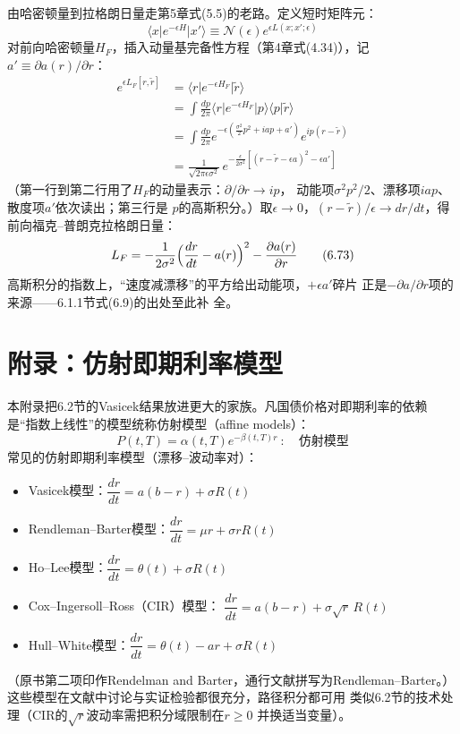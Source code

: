 由哈密顿量到拉格朗日量走第5章式(5.5)的老路。定义短时矩阵元：
\begin{equation*}
\langle x\vert e^{-\epsilon H}\vert x'\rangle\equiv
\mathcal{N}(\epsilon)e^{\epsilon L(x;x';\epsilon)}
\tag{6.72}
\end{equation*}
对前向哈密顿量$H_F$，插入动量基完备性方程（第4章式(4.34)），记
$a'\equiv\partial a(r)/\partial r$：
\begin{align*}
e^{\epsilon L_F[r,\tilde{r}]}&=\langle r\vert e^{-\epsilon H_F}
\vert\tilde{r}\rangle\\
&=\int\frac{dp}{2\pi}\langle r\vert e^{-\epsilon H_F}\vert p\rangle
\langle p\vert\tilde{r}\rangle\\
&=\int\frac{dp}{2\pi}e^{-\epsilon\left(\frac{\sigma^2}{2}p^2+iap+a'\right)}
e^{ip(r-\tilde{r})}\\
&=\frac{1}{\sqrt{2\pi\epsilon\sigma^2}}\,
e^{-\frac{\epsilon}{2\sigma^2}\left[(r-\tilde{r}-\epsilon a)^2
-\epsilon a'\right]}
\end{align*}
（第一行到第二行用了$H_F$的动量表示：$\partial/\partial r\to ip$，
动能项$\sigma^2p^2/2$、漂移项$iap$、散度项$a'$依次读出；第三行是
$p$的高斯积分。）取$\epsilon\to0$，$(r-\tilde{r})/\epsilon\to
dr/dt$，得前向福克--普朗克拉格朗日量：
\begin{equation*}
L_F=-\frac{1}{2\sigma^2}\Bigl(\frac{dr}{dt}-a(r)\Bigr)^2
-\frac{\partial a(r)}{\partial r}
\tag{6.73}
\end{equation*}
高斯积分的指数上，“速度减漂移”的平方给出动能项，$+\epsilon a'$碎片
正是$-\partial a/\partial r$项的来源——6.1.1节式(6.9)的出处至此补
全。

\section{附录：仿射即期利率模型}

本附录把6.2节的Vasicek结果放进更大的家族。凡国债价格对即期利率的依赖
是“指数上线性”的模型统称仿射模型（affine models）：
\begin{equation*}
P(t,T)=\alpha(t,T)e^{-\beta(t,T)r}\ :\quad\text{仿射模型}
\end{equation*}
常见的仿射即期利率模型（漂移--波动率对）：
\begin{itemize}
\item Vasicek模型：$\dfrac{dr}{dt}=a(b-r)+\sigma R(t)$
\item Rendleman--Barter模型：$\dfrac{dr}{dt}=\mu r+\sigma rR(t)$
\item Ho--Lee模型：$\dfrac{dr}{dt}=\theta(t)+\sigma R(t)$
\item Cox--Ingersoll--Ross（CIR）模型：
$\dfrac{dr}{dt}=a(b-r)+\sigma\sqrt{r}\,R(t)$
\item Hull--White模型：$\dfrac{dr}{dt}=\theta(t)-ar+\sigma R(t)$
\end{itemize}
（原书第二项印作Rendelman and Barter，通行文献拼写为Rendleman--Barter。）这些模型在文献中讨论与实证检验都很充分，路径积分都可用
类似6.2节的技术处理（CIR的$\sqrt{r}$波动率需把积分域限制在$r\geq0$
并换适当变量）。

